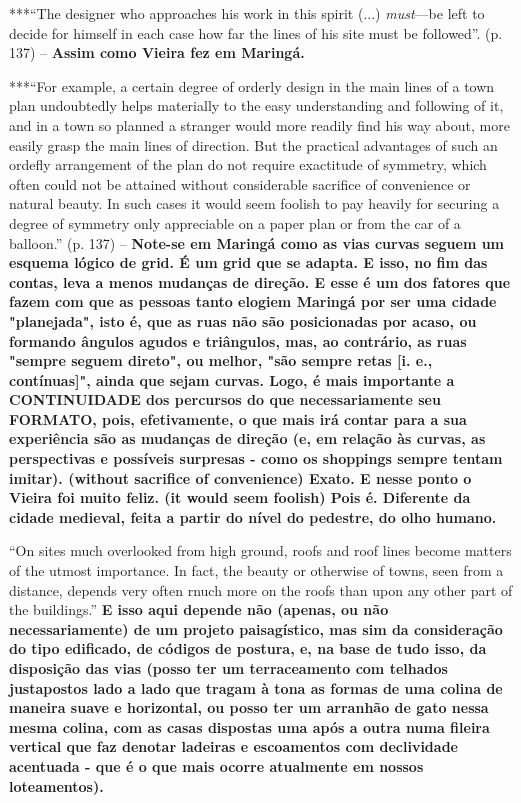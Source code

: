\documentclass[12pt, a4paper]{book} %
\begin{document}
        ***``The designer who approaches his work in this spirit (...) \textit{must}—be left to decide for himself in each case how far the lines of his site must be followed''. (p. 137) – \textbf{Assim como Vieira fez em Maringá.}

        ***``For example, a certain degree of orderly design in the main lines of a town plan undoubtedly helps materially to the easy understanding and following of it, and in a town so planned a stranger would more readily find his way about, more easily grasp the main lines of direction. But the practical advantages of such an ordefly arrangement of the plan do not require exactitude of symmetry, which often could not be attained without considerable sacrifice of convenience or natural beauty. In such cases it would seem foolish to pay heavily for securing a degree of symmetry only appreciable on a paper plan or from the car of a balloon.'' (p. 137) – \textbf{Note-se em Maringá como as vias curvas seguem um esquema lógico de grid. É um grid que se adapta. E isso, no fim das contas, leva a menos mudanças de direção. E esse é um dos fatores que fazem com que as pessoas tanto elogiem Maringá por ser uma cidade "planejada", isto é, que as ruas não são posicionadas por acaso, ou formando ângulos agudos e triângulos, mas, ao contrário, as ruas "sempre seguem direto", ou melhor, "são sempre retas [i. e., contínuas]", ainda que sejam curvas. 
        Logo, é mais importante a CONTINUIDADE dos percursos do que necessariamente seu FORMATO, pois, efetivamente, o que mais irá contar para a sua experiência são as mudanças de direção (e, em relação às curvas, as perspectivas e possíveis surpresas - como os shoppings sempre tentam imitar).
        (without sacrifice of convenience) Exato. E nesse ponto o Vieira foi muito feliz. (it would seem foolish) Pois é. Diferente da cidade medieval, feita a partir do nível do pedestre, do olho humano.}

        ``On sites much overlooked from high ground, roofs and roof lines become matters of the utmost importance. In fact, the beauty or otherwise of towns, seen from a distance, depends very often rnuch more on the roofs than upon any other part of the buildings.'' \textbf{E isso aqui depende não (apenas, ou não necessariamente) de um projeto paisagístico, mas sim da consideração do tipo edificado, de códigos de postura, e, na base de tudo isso, da disposição das vias (posso ter um terraceamento com telhados justapostos lado a lado que tragam à tona as formas de uma colina de maneira suave e horizontal, ou posso ter um arranhão de gato nessa mesma colina, com as casas dispostas uma após a outra numa fileira vertical que faz denotar ladeiras e escoamentos com declividade acentuada - que é o que mais ocorre atualmente em nossos loteamentos).}
\end{document}
